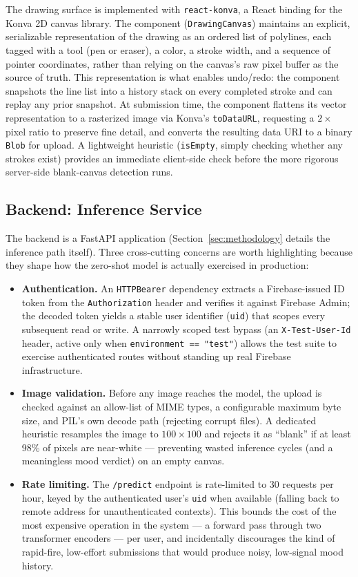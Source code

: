 \documentclass[10pt,twocolumn,letterpaper]{article}
\begin{document}
The drawing surface is implemented with \texttt{react-konva}, a React binding for the Konva 2D canvas library. The component (\texttt{DrawingCanvas}) maintains an explicit, serializable representation of the drawing as an ordered list of polylines, each tagged with a tool (pen or eraser), a color, a stroke width, and a sequence of pointer coordinates, rather than relying on the canvas's raw pixel buffer as the source of truth. This representation is what enables undo/redo: the component snapshots the line list into a history stack on every completed stroke and can replay any prior snapshot. At submission time, the component flattens its vector representation to a rasterized image via Konva's \texttt{toDataURL}, requesting a $2\times$ pixel ratio to preserve fine detail, and converts the resulting data URI to a binary \texttt{Blob} for upload. A lightweight heuristic (\texttt{isEmpty}, simply checking whether any strokes exist) provides an immediate client-side check before the more rigorous server-side blank-canvas detection runs.

\subsection{Backend: Inference Service}

The backend is a FastAPI application (Section~\ref{sec:methodology} details the inference path itself). Three cross-cutting concerns are worth highlighting because they shape how the zero-shot model is actually exercised in production:

\begin{itemize}
    \item \textbf{Authentication.} An \texttt{HTTPBearer} dependency extracts a Firebase-issued ID token from the \texttt{Authorization} header and verifies it against Firebase Admin; the decoded token yields a stable user identifier (\texttt{uid}) that scopes every subsequent read or write. A narrowly scoped test bypass (an \texttt{X-Test-User-Id} header, active only when \texttt{environment == "test"}) allows the test suite to exercise authenticated routes without standing up real Firebase infrastructure.
    \item \textbf{Image validation.} Before any image reaches the model, the upload is checked against an allow-list of MIME types, a configurable maximum byte size, and PIL's own decode path (rejecting corrupt files). A dedicated heuristic resamples the image to $100\times100$ and rejects it as ``blank'' if at least 98\% of pixels are near-white --- preventing wasted inference cycles (and a meaningless mood verdict) on an empty canvas.
    \item \textbf{Rate limiting.} The \texttt{/predict} endpoint is rate-limited to 30 requests per hour, keyed by the authenticated user's \texttt{uid} when available (falling back to remote address for unauthenticated contexts). This bounds the cost of the most expensive operation in the system --- a forward pass through two transformer encoders --- per user, and incidentally discourages the kind of rapid-fire, low-effort submissions that would produce noisy, low-signal mood history.
\end{itemize}
\end{document}
